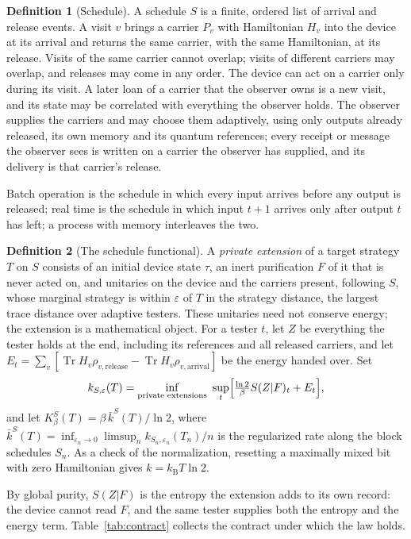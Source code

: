 \documentclass[11pt]{article}
\theoremstyle{definition}
\newtheorem{definition}{Definition}
\theoremstyle{remark}
\newcommand{\Tr}{\operatorname{Tr}}
\newcommand{\kB}{k_{\mathrm B}}
\begin{document}
\begin{definition}[Schedule]\label{def:schedule}
A schedule $S$ is a finite, ordered list of arrival and release events. A visit $v$ brings a carrier $P_v$ with Hamiltonian $H_v$ into the device at its arrival and returns the same carrier, with the same Hamiltonian, at its release. Visits of the same carrier cannot overlap; visits of different carriers may overlap, and releases may come in any order. The device can act on a carrier only during its visit. A later loan of a carrier that the observer owns is a new visit, and its state may be correlated with everything the observer holds. The observer supplies the carriers and may choose them adaptively, using only outputs already released, its own memory and its quantum references; every receipt or message the observer sees is written on a carrier the observer has supplied, and its delivery is that carrier's release.
\end{definition}

Batch operation is the schedule in which every input arrives before any output is released; real time is the schedule in which input $t+1$ arrives only after output $t$ has left; a process with memory interleaves the two.

\begin{definition}[The schedule functional]
A \emph{private extension} of a target strategy $T$ on $S$ consists of an initial device state $\tau$, an inert purification $F$ of it that is never acted on, and unitaries on the device and the carriers present, following $S$, whose marginal strategy is within $\varepsilon$ of $T$ in the strategy distance, the largest trace distance over adaptive testers. These unitaries need not conserve energy; the extension is a mathematical object. For a tester $t$, let $Z$ be everything the tester holds at the end, including its references and all released carriers, and let $E_t=\sum_v[\Tr H_v\rho_{v,\mathrm{release}}-\Tr H_v\rho_{v,\mathrm{arrival}}]$ be the energy handed over. Set
\[
k_{S,\varepsilon}(T)=\inf_{\text{private extensions}}\ \sup_t\Bigl[\tfrac{\ln2}\beta S(Z|F)_t+E_t\Bigr],
\]
and let $K_\beta^S(T)=\beta\,\bar k^S(T)/\ln2$, where $\bar k^S(T)=\inf_{\varepsilon_n\to0}\limsup_n k_{S_n,\varepsilon_n}(T_n)/n$ is the regularized rate along the block schedules $S_n$. As a check of the normalization, resetting a maximally mixed bit with zero Hamiltonian gives $k=\kB T\ln2$.
\end{definition}

By global purity, $S(Z|F)$ is the entropy the extension adds to its own record: the device cannot read $F$, and the same tester supplies both the entropy and the energy term. Table~\ref{tab:contract} collects the contract under which the law holds.
\end{document}
